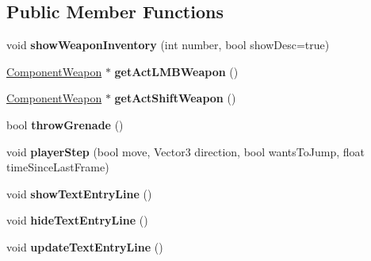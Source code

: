 \subsection*{\-Public \-Member \-Functions}
\begin{DoxyCompactItemize}
\item 
\hypertarget{classComponentPlayer_a9181ecf4d4afbbd8fce8abd7614c6cf6}{
void {\bfseries show\-Weapon\-Inventory} (int number, bool show\-Desc=true)}
\label{d5/d28/classComponentPlayer_a9181ecf4d4afbbd8fce8abd7614c6cf6}

\item 
\hypertarget{classComponentPlayer_a70c19dd2b6e670fc6f7629e0bb543de3}{
\hyperlink{classComponentWeapon}{\-Component\-Weapon} $\ast$ {\bfseries get\-Act\-L\-M\-B\-Weapon} ()}
\label{d5/d28/classComponentPlayer_a70c19dd2b6e670fc6f7629e0bb543de3}

\item 
\hypertarget{classComponentPlayer_a3314a8bfb6b045f9517c8d350b4dbdab}{
\hyperlink{classComponentWeapon}{\-Component\-Weapon} $\ast$ {\bfseries get\-Act\-Shift\-Weapon} ()}
\label{d5/d28/classComponentPlayer_a3314a8bfb6b045f9517c8d350b4dbdab}

\item 
\hypertarget{classComponentPlayer_ae570481b3d41d6d0b1d17cbbcf4dbcb4}{
bool {\bfseries throw\-Grenade} ()}
\label{d5/d28/classComponentPlayer_ae570481b3d41d6d0b1d17cbbcf4dbcb4}

\item 
\hypertarget{classComponentPlayer_a32ed62bf78c00e970961f0001f84ae06}{
void {\bfseries player\-Step} (bool move, \-Vector3 direction, bool wants\-To\-Jump, float time\-Since\-Last\-Frame)}
\label{d5/d28/classComponentPlayer_a32ed62bf78c00e970961f0001f84ae06}

\item 
\hypertarget{classComponentPlayer_aeaaf91455fcdfca3acbe04893d07c521}{
void {\bfseries show\-Text\-Entry\-Line} ()}
\label{d5/d28/classComponentPlayer_aeaaf91455fcdfca3acbe04893d07c521}

\item 
\hypertarget{classComponentPlayer_aa1737307547d679cd1926e84f9182430}{
void {\bfseries hide\-Text\-Entry\-Line} ()}
\label{d5/d28/classComponentPlayer_aa1737307547d679cd1926e84f9182430}

\item 
\hypertarget{classComponentPlayer_aae9348b16d0d8a8eb9e9f0300cf41f72}{
void {\bfseries update\-Text\-Entry\-Line} ()}
\label{d5/d28/classComponentPlayer_aae9348b16d0d8a8eb9e9f0300cf41f72}


\end{DoxyCompactItemize}
